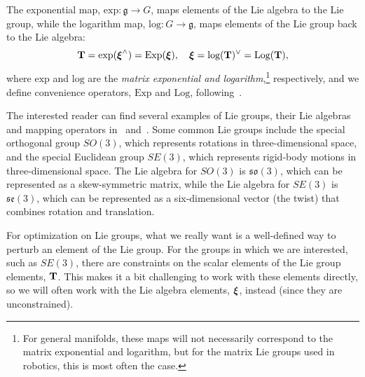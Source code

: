 The exponential map, $\mbox{exp}: \mathfrak{g} \to G$, maps elements of the Lie algebra to the Lie group, while the logarithm map, $\mbox{log}: G \to \mathfrak{g}$, maps elements of the Lie group back to the Lie algebra: 
\begin{equation}
\mathbf{T} = \mbox{exp}({\boldsymbol{\xi}}^\wedge)= \mbox{Exp}({\boldsymbol{\xi}}), \quad {\boldsymbol{\xi}} = \mbox{log}(\mathbf{T})^\vee=\mbox{Log}(\mathbf{T}),
\end{equation}
where $\mbox{exp}$ and $\mbox{log}$ are the {\em matrix exponential and logarithm},\footnote{For general manifolds, these maps will not necessarily correspond to the matrix exponential and logarithm, but for the matrix Lie groups used in robotics, this is most often the case.} respectively, and we define convenience operators, $\mbox{Exp}$ and $\mbox{Log}$, following~\citet{solaMicroLieTheory2021}.

The interested reader can find several examples of Lie groups, their Lie algebras and mapping operators in~\citet{solaMicroLieTheory2021} and~\citet{barfoot_ser24}.
Some common Lie groups include the special orthogonal group $SO(3)$, which represents rotations in three-dimensional space, and the special Euclidean group $SE(3)$, which represents rigid-body motions in three-dimensional space.  The Lie algebra for $SO(3)$ is $\mathfrak{so}(3)$, which can be represented as a skew-symmetric matrix, while the Lie algebra for $SE(3)$ is $\mathfrak{se}(3)$, which can be represented as a six-dimensional vector (the twist) that combines rotation and translation.

For optimization on Lie groups, what we really want is a well-defined way to perturb an element of the Lie group.
For the groups in which we are interested, such as $SE(3)$, there are constraints on the scalar elements of the Lie group elements, $\mathbf{T}$.  This makes it a bit challenging to work with these elements directly, so we will often work with the Lie algebra elements, ${\boldsymbol{\xi}}$, instead (since they are unconstrained). 

